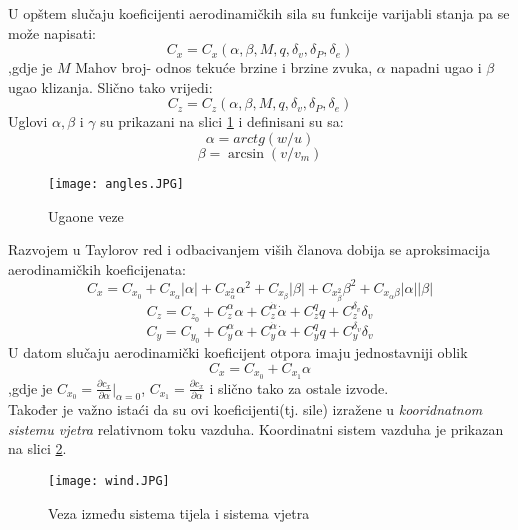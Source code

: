 U opštem slučaju koeficijenti aerodinamičkih sila su funkcije varijabli stanja pa se može
napisati:
\begin{equation}
    C_x=C_x(\alpha ,\beta, M,q,\delta_v,\delta_P,\delta_e)
\end{equation}
,gdje je $M$ Mahov broj- odnos tekuće brzine i brzine zvuka, $\alpha$ napadni ugao i 
$\beta$ ugao klizanja. Slično tako vrijedi:
\begin{equation}
    C_z=C_z(\alpha ,\beta, M,q,\delta_v,\delta_P,\delta_e)
\end{equation}
Uglovi $\alpha, \beta$ i $\gamma$ su prikazani na slici \ref{fig:angles} i definisani su sa:
\begin{equation}
    \alpha=arctg(w/u)
\end{equation}
\begin{equation}
    \beta=\arcsin(v/v_m)
\end{equation}
\begin{figure}[h!]
    \centering
    \texttt{[image: angles.JPG]}
    \caption{Ugaone veze}
    \label{fig:angles}
\end{figure}
Razvojem u Taylorov red i odbacivanjem viših članova dobija se aproksimacija 
aerodinamičkih koeficijenata:
\begin{equation}
    C_x=C_{x_0}+C_{x_\alpha}|\alpha|+C_{x_\alpha^2}\alpha^2+C_{x_\beta}|\beta|+
    C_{x_\beta^2}\beta^2+C_{x_\alpha \beta}|\alpha||\beta|
\end{equation}
\begin{equation}
   C_z=C_{z_0}+C_z^{\alpha}{\alpha} + C_z^{\dot{\alpha}} \dot{\alpha}+C_z^q q+C_z^{\delta _v}{\delta _v}
\end{equation}
\begin{equation}
    C_y=C_{y_0}+C_y^{\alpha}{\alpha} + C_y^{\dot{\alpha}} \dot{\alpha}+C_y^q q+C_y^{\delta _v}{\delta _v}
\end{equation}
U datom slučaju aerodinamički koeficijent otpora imaju jednostavniji oblik
\begin{equation}
    C_x=C_{x_0} + C_{x_1}\alpha
\end{equation}
,gdje je $C_{x_0}=\frac{\partial c_x}{\partial \alpha}|_{\alpha=0}$, $C_{x_1}=\frac{\partial c_x}{\partial \alpha}$ 
i slično tako za ostale izvode.\\
Također je važno istaći da su ovi koeficijenti(tj. sile) izražene u \textit{kooridnatnom sistemu vjetra} 
relativnom toku vazduha. Koordinatni sistem vazduha je prikazan na slici \ref{fig:wind}. 
\begin{figure}[h!]
    \centering
    \texttt{[image: wind.JPG]}
    \caption{Veza između sistema tijela i sistema vjetra}
    \label{fig:wind}
\end{figure}

